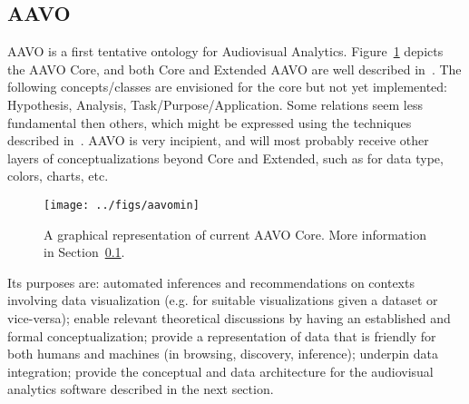 \documentclass[letterpaper,10pt]{article}
\begin{document}
\subsection{AAVO}\label{sec:aavo}
AAVO is a first tentative ontology for Audiovisual Analytics.
Figure~\ref{aavo} depicts the AAVO Core,
and both Core and Extended AAVO are well described in~\cite{aavo}.
The following concepts/classes are envisioned for the core
but not yet implemented:
Hypothesis, Analysis, Task/Purpose/Application.
Some relations seem less fundamental then others,
which might be expressed using the techniques described
in~\cite{ont}.
AAVO is very incipient, and will most probably receive
other layers of conceptualizations beyond Core and Extended,
such as for data type, colors, charts, etc.

\begin{figure}[htbp]
  \centering
  \texttt{[image: ../figs/aavomin]}
\caption{A graphical representation of current AAVO Core.
	More information in Section~\ref{sec:aavo}.}\label{aavo}
\end{figure}

Its purposes are: automated inferences and recommendations on
contexts involving data visualization (e.g. for suitable visualizations given a
dataset or vice-versa);
enable relevant theoretical discussions by having an
established and formal conceptualization;
provide a representation of data that is friendly for
both humans and machines (in browsing, discovery, inference);
underpin data integration;
provide the conceptual and data architecture for
the audiovisual analytics software described in
the next section.
\end{document}
